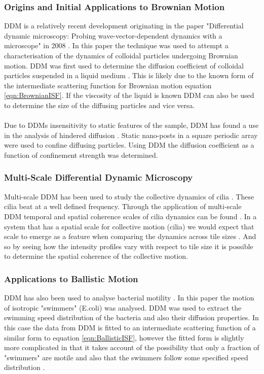 \documentclass[11pt]{article}
\begin{document}
\subsubsection{Origins and Initial Applications to Brownian Motion}
DDM is a relatively recent development originating in the paper "Differential dynamic microscopy: Probing wave-vector-dependent dynamics with a microscope" in 2008 \cite{ddm0}. In this paper the technique was used to attempt a characterisation of the dynamics of colloidal particles undergoing Brownian motion. DDM was first used to determine the diffusion coefficient of colloidal particles suspended in a liquid medium \cite{ddm0} \cite{ddm_maths}. This is likely due to the known form of the intermediate scattering function for Brownian motion equation \ref{eqn:BrownianISF}. If the viscosity of the liquid is known DDM can also be used to determine the size of the diffusing particles \cite{ddm1} and vice versa. 
\\\\
Due to DDMs insensitivity to static features of the sample, DDM has found a use in the analysis of hindered diffusion \cite{nanoposts}. Static nano-posts in a square periodic array were used to confine diffusing particles. Using DDM the diffusion coefficient as a function of confinement strength was determined.

\subsubsection{Multi-Scale Differential Dynamic Microscopy}
Multi-scale DDM has been used to study the collective dynamics of cilia \cite{ddm2}. These cilia beat at a well defined frequency. Through the application of multi-scale DDM temporal and spatial coherence scales of cilia dynamics can be found \cite{ddm1}. In a system that has a spatial scale for collective motion (cilia) we would expect that scale to emerge as a feature when comparing the dynamics across tile sizes \cite{ddm1}. And so by seeing how the intensity profiles vary with respect to tile size it is possible to determine the spatial coherence of the collective motion.

\subsubsection{Applications to Ballistic Motion}
DDM has also been used to analyse bacterial motility \cite{bacterial_motility}. In this paper the motion of isotropic "swimmers" (E.coli) was analysed. DDM was used to extract the swimming speed distribution of the bacteria and also their diffusion properties. In this case the data from DDM is fitted to an intermediate scattering function of a similar form to equation \ref{eqn:BallisticISF}, however the fitted form is slightly more complicated in that it takes account of the possibility that only a fraction of "swimmers" are motile and also that the swimmers follow some specified speed distribution \cite{bacterial_motility}.
\end{document}

